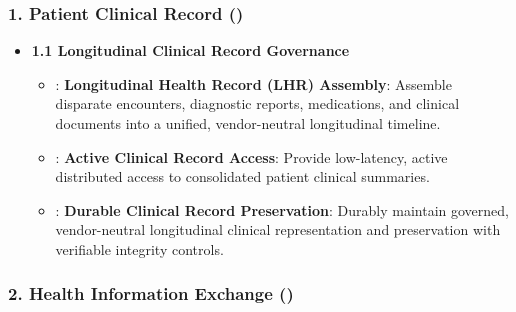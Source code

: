 \subsubsection*{1. Patient Clinical Record (\texttt{})}
\label{rad:enabling:609}

\begin{itemize}

\item 
\textbf{1.1 Longitudinal Clinical Record Governance}


\begin{itemize}

\item 
\texttt{}: \textbf{Longitudinal Health Record (LHR) Assembly}: Assemble disparate encounters, diagnostic reports, medications, and clinical documents into a unified, vendor-neutral longitudinal timeline.



\item 
\texttt{}: \textbf{Active Clinical Record Access}: Provide low-latency, active distributed access to consolidated patient clinical summaries.



\item 
\texttt{}: \textbf{Durable Clinical Record Preservation}: Durably maintain governed, vendor-neutral longitudinal clinical representation and preservation with verifiable integrity controls.



\end{itemize}


\end{itemize}
\label{rad:enabling:614}
\subsubsection*{2. Health Information Exchange (\texttt{})}
\label{rad:enabling:615}


